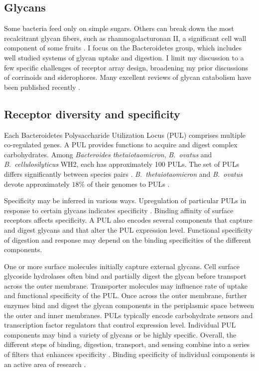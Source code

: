 \documentclass[\mydocfontsize]{article}
\begin{document}
\begin{multicols}{2}
\section{Glycans}

Some bacteria feed only on simple sugars. Others can break down the most recalcitrant glycan fibers, such as rhamnogalacturonan II, a significant cell wall component of some fruits \autocite{ndeh17complex}. I focus on the Bacteroidetes group, which includes well studied systems of glycan uptake and digestion. I limit my discussion to a few specific challenges of receptor array design, broadening my prior discussions of corrinoids and siderophores. Many excellent reviews of glycan catabolism have been published recently \autocite[e.g.,][]{hamaker14a-perspective,martens14the-devil,grondin17polysaccharide}. 

\subsection{Receptor diversity and specificity}

Each Bacteroidetes Polysaccharide Utilization Locus (PUL) comprises multiple co-regulated genes. A PUL provides functions to acquire and digest complex carbohydrates. Among \textit{Bacteroides thetaiotaomicron}, \textit{B.~ovatus} and \textit{B.~cellulosilyticus} WH2, each has approximately 100 PULs. The set of PULs differs significantly between species pairs \autocite{grondin17polysaccharide}. \textit{B.~thetaiotaomicron} and \textit{B.~ovatus} devote approximately $18\%$ of their genomes to PULs \autocite{martens11recognition}.

Specificity may be inferred in various ways. Upregulation of particular PULs in response to certain glycans indicates specificity \autocite{martens11recognition,kabisch14functional}. Binding affinity of surface receptors affects specificity. A PUL also encodes several components that capture and digest glycans and that alter the PUL expression level. Functional specificity of digestion and response may depend on the binding specificities of the different components. 

One or more surface molecules initially capture external glycans. Cell surface glycoside hydrolases often bind and partially digest the glycan before transport across the outer membrane. Transporter molecules may influence rate of uptake and functional specificity of the PUL. Once across the outer membrane, further enzymes bind and digest the glycan components in the periplasmic space between the outer and inner membranes. PULs typically encode carbohydrate sensors and transcription factor regulators that control expression level. Individual PUL components may bind a variety of glycans or be highly specific. Overall, the different steps of binding, digestion, transport, and sensing combine into a series of filters that enhances specificity \autocite{cuskin12how-nature,gilbert13advances}. Binding specificity of individual components is an active area of research \autocite{grant14recent,tauzin16molecular,glenwright17structural,ndeh17complex}.


\end{multicols}
\end{document}

